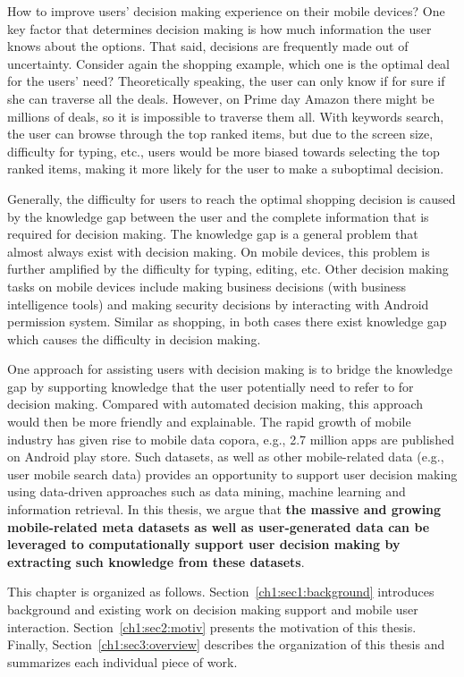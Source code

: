 How to improve users' decision making experience on their mobile devices? One key factor that determines decision making is how much information the user knows about the options. That said, decisions are frequently made out of uncertainty. Consider again the shopping example, which one is the optimal deal for the users' need? Theoretically speaking, the user can only know if for sure if she can traverse all the deals. However, on Prime day Amazon there might be millions of deals, so it is impossible to traverse them all. With keywords search, the user can browse through the top ranked items, but due to the screen size, difficulty for typing, etc., users would be more biased towards selecting the top ranked items, making it more likely for the user to make a suboptimal decision. 

Generally, the difficulty for users to reach the optimal shopping decision is caused by the knowledge gap between the user and the complete information that is required for decision making. The knowledge gap is a general problem that almost always exist with decision making. On mobile devices, this problem is further amplified by the difficulty for typing, editing, etc. Other decision making tasks on mobile devices include making business decisions (with business intelligence tools) and making security decisions by interacting with Android permission system. Similar as shopping, in both cases there exist knowledge gap which causes the difficulty in decision making. 

One approach for assisting users with decision making is to bridge the knowledge gap by supporting knowledge that the user potentially need to refer to for decision making. Compared with automated decision making, this approach would then be more friendly and explainable. The rapid growth of mobile industry has given rise to mobile data copora, e.g., 2.7 million apps are published on Android play store. Such datasets, as well as other mobile-related data (e.g., user mobile search data) provides an opportunity to support user decision making using data-driven approaches such as data mining, machine learning and information retrieval. In this thesis, we argue that \textbf{the massive and growing mobile-related meta datasets as well as user-generated data can be leveraged to computationally support user decision making by extracting such knowledge from these datasets}. 

This chapter is organized as follows. Section~\ref{ch1:sec1:background} introduces background and existing work on decision making support and mobile user interaction. Section~\ref{ch1:sec2:motiv} presents the motivation of this thesis. Finally, Section~\ref{ch1:sec3:overview} describes the organization of this thesis and summarizes each individual piece of work. 





